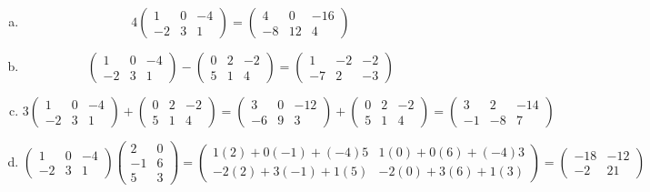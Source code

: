 \documentclass[11pt,letterpaper]{article}
\begin{document}
\sol 
\begin{enumerate}[(a)]
\item 
	\[
	4 \begin{pmatrix} 1 & 0 & -4 \\ -2 & 3 & 1 \end{pmatrix}= \begin{pmatrix} 4 & 0 & -16 \\ -8 & 12 & 4 \end{pmatrix}
	\]

\item 
	\[
	\begin{pmatrix} 1 & 0 & -4 \\ -2 & 3 & 1 \end{pmatrix} - \begin{pmatrix} 0 & 2 & -2 \\ 5 & 1 & 4 \end{pmatrix}= \begin{pmatrix} 1 & -2 & -2 \\ -7 & 2 & -3 \end{pmatrix}
	\]

\item 
	\[
	3 \begin{pmatrix} 1 & 0 & -4 \\ -2 & 3 & 1 \end{pmatrix} + \begin{pmatrix} 0 & 2 & -2 \\ 5 & 1 & 4 \end{pmatrix}= \begin{pmatrix} 3 & 0 & -12 \\ -6 & 9 & 3 \end{pmatrix} + \begin{pmatrix} 0 & 2 & -2 \\ 5 & 1 & 4 \end{pmatrix}= \begin{pmatrix} 3 & 2 & -14 \\ -1 & -8 & 7 \end{pmatrix}
	\]

\item 
	\[
	\begin{pmatrix} 1 & 0 & -4 \\ -2 & 3 & 1 \end{pmatrix} \begin{pmatrix} 2 & 0 \\ -1 & 6 \\ 5 & 3 \end{pmatrix}= \begin{pmatrix} 1(2) + 0(-1) + (-4)5 & 1(0) + 0(6) + (-4)3 \\ -2(2) + 3(-1) + 1(5) & -2(0) + 3(6) + 1(3) \end{pmatrix}= \begin{pmatrix} -18 & -12 \\ -2 & 21 \end{pmatrix}
	\]
	

\end{enumerate}
\end{document}

